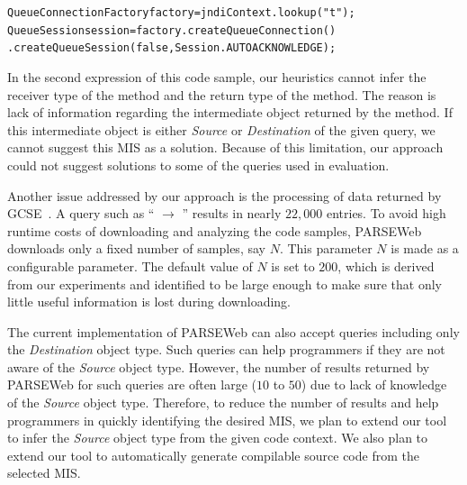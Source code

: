 \documentclass{fp035-thummalapenta}
\begin{document}
\vspace*{-1ex}
\begin{CodeOut}
\begin{alltt}
QueueConnectionFactory factory = jndiContext.lookup("t");
QueueSession session = factory.createQueueConnection()
\hspace*{0.2in}.createQueueSession(false,Session.AUTOACKNOWLEDGE);
\end{alltt}
\end{CodeOut}
\vspace*{-1ex}

In the second expression of this code sample, our heuristics cannot
infer the receiver type of the  method
and the return type of the  method.
The reason is lack of information regarding the intermediate object
returned by the  method. If this intermediate
object is either \emph{Source} or \emph{Destination} of the given
query, we cannot suggest this MIS as a solution. 
Because of this limitation, our approach could not suggest
solutions to some of the queries used in evaluation.

Another issue addressed by our approach is the processing of data
returned by GCSE~\cite{GCSE}. A query such as
`` $\rightarrow$ '' results in
nearly $22,000$ entries. To avoid high runtime costs of downloading and analyzing
the code samples, PARSEWeb downloads only a fixed number of
samples, say $N$. This parameter $N$ is made as a configurable
parameter. The default value of $N$ is set to $200$, which is derived
from our experiments and identified to be large enough to make sure
that only little useful information is lost during downloading.

The current implementation of PARSEWeb can also accept queries
including only the \emph{Destination} object type. Such queries can
help programmers if they are not aware of the \emph{Source} object
type. However, the number of results returned by PARSEWeb for such
queries are often large ($10$ to $50$) due to lack of knowledge of
the \emph{Source} object type. Therefore, to reduce the number of
results and help programmers in quickly identifying the desired MIS,
we plan to extend our tool to infer the \emph{Source} object type
from the given code context. We also plan to extend our tool to
automatically generate compilable source code from the selected MIS.
\end{document}
